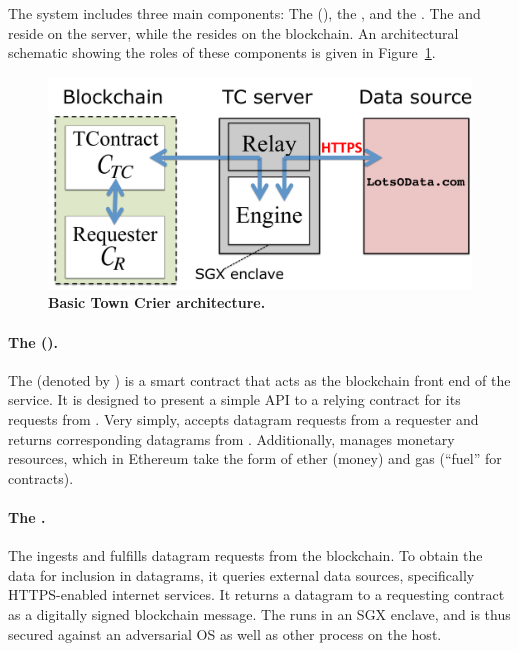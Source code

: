 The \tcs system includes three main components: The \tcontract (\tcont), the \encname, and the \medname. The \encname and \medname reside on the \tc server, while the \tcontract  resides on the blockchain. An architectural schematic showing the roles of these components is given in Figure~\ref{fig:overview}.

\vspace{-2mm}
\begin{figure}[h!]
\centering
\includegraphics[width=\columnwidth]{figures/OverviewFig}
\caption{{\bf Basic Town Crier architecture.}}
\label{fig:overview}
\end{figure}
\vspace{-2mm}

\paragraph{The \tcontract (\tcont).} The \tcontract (denoted by \tcont) is a smart contract that acts as the blockchain front end of the \tc service. It is designed to present a simple API to a relying contract \reqcont for its requests from \tc. Very simply, \tcont accepts datagram requests from a requester \reqcont and returns corresponding datagrams from \tc. Additionally, \tcont manages \tc monetary resources, which in Ethereum take the form of ether (money) and gas (``fuel'' for contracts).

\paragraph{The \encname.}
The \encname ingests and fulfills datagram requests from the blockchain. To obtain the data for inclusion in datagrams, it queries external data sources, specifically HTTPS-enabled internet services. It returns a datagram to a requesting contract \reqcont as a digitally signed blockchain message. The \encname runs in an SGX enclave, and is thus secured against an adversarial OS as well as other process on the host. 

